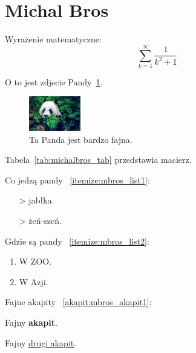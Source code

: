 \section{Michal Bros}
\label{sec:michalbros}

Wyrażenie matematyczne: $$\sum_{k=1}^{\infty}\frac{1}{k^2+1}$$

O to jest zdjecie Pandy~\ref{fig:pandzia}.

\begin{figure}[htbp]
    \centering
    \includegraphics[width=0.2\textwidth]{pictures/pandzia.png}
    \caption{Ta Panda jest bardzo fajna.}
    \label{fig:pandzia}
\end{figure}

Tabela~\ref{tab:michalbros_tab} przedstawia macierz.


Co jedzą pandy ~\ref{itemize:mbros_list1}:
\begin{itemize}
  \item[>] jabłka.
  \item[>] żeń-szeń.
  \label{itemize:mbros_list1}
\end{itemize}

Gdzie są pandy ~\ref{itemize:mbros_list2}:
\begin{enumerate}
  \item W ZOO.
  \item W Azji.
  \label{itemize:mbros_list2}
\end{enumerate}

Fajne akapity ~\ref{akapit:mbros_akapit1}: 
\begin{center}
    Fajny \textbf{akapit}. \par
    Fajny \underline{drugi akapit}.
    \label{akapit:mbros_akapit1}
\end{center}